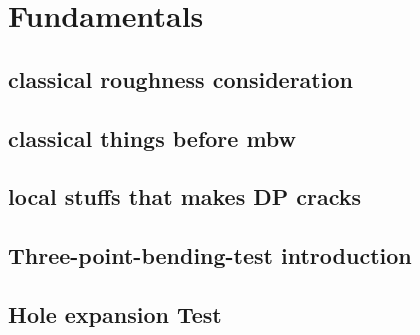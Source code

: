 \section{Fundamentals}\label{ch:intro:se:fund}

\subsection{classical roughness consideration}

\subsection{classical things before mbw}

\subsection{local stuffs that makes DP cracks}

\subsection{Three-point-bending-test introduction}

\subsection{Hole expansion Test}
